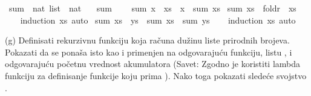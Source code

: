 \begin{isabellebody}
\begin{exercise}[subtitle=Primer jednostavne teorije]
\begin{isamarkuptext}
\end{isamarkuptext}\isamarkuptrue%
\isamarkupfalse%
\ sum\ {\isacharcolon}{\kern0pt}{\isacharcolon}{\kern0pt}\ {\isachardoublequoteopen}nat\ list\ {\isasymRightarrow}\ nat{\isachardoublequoteclose}\ \isanewline
\ \ {\isachardoublequoteopen}sum\ {\isacharbrackleft}{\kern0pt}{\isacharbrackright}{\kern0pt}\ {\isacharequal}{\kern0pt}\ {}{\isachardoublequoteclose}\isanewline
{\isacharbar}{\kern0pt}\ {\isachardoublequoteopen}sum\ {\isacharparenleft}{\kern0pt}x\ {\isacharhash}{\kern0pt}\ xs{\isacharparenright}{\kern0pt}\ {\isacharequal}{\kern0pt}\ x\ {\isacharplus}{\kern0pt}\ sum\ xs{\isachardoublequoteclose}\isanewline
\isanewline
{}\isamarkupfalse%
\ {\isachardoublequoteopen}sum\ xs\ {\isacharequal}{\kern0pt}\ foldr\ {\isacharparenleft}{\kern0pt}{\isacharplus}{\kern0pt}{\isacharparenright}{\kern0pt}\ xs\ {}{\isachardoublequoteclose}\isanewline
%
\isadelimproof
\ \ %
\endisadelimproof
%
\isatagproof
{}\isamarkupfalse%
\ {\isacharparenleft}{\kern0pt}induction\ xs{\isacharparenright}{\kern0pt}\ auto%
\endisatagproof
{\isafoldproof}%
%
\isadelimproof
\isanewline
%
\endisadelimproof
\isanewline
{}\isamarkupfalse%
\ {\isachardoublequoteopen}sum\ {\isacharparenleft}{\kern0pt}xs\ {\isacharat}{\kern0pt}\ ys{\isacharparenright}{\kern0pt}\ {\isacharequal}{\kern0pt}\ sum\ xs\ {\isacharplus}{\kern0pt}\ sum\ ys{\isachardoublequoteclose}\isanewline
%
\isadelimproof
\ \ %
\endisadelimproof
%
\isatagproof
{}\isamarkupfalse%
\ {\isacharparenleft}{\kern0pt}induction\ xs{\isacharparenright}{\kern0pt}\ auto%
\endisatagproof
{\isafoldproof}%
%
\isadelimproof
%
\endisadelimproof
%
\begin{isamarkuptext}%
(g) Definisati rekurzivnu funkciju  koja računa dužinu 
          liste prirodnih brojeva. Pokazati da se  ponaša isto kao 
          i  primenjen na odgovarajuću funkciju, listu , i
          odgovarajuću početnu vrednost akumulatora (Savet: Zgodno je koristiti 
          lambda funkciju  za definisanje funkcije koju prima
          ). Nako toga pokazati sledeće svojstvo 
          .%

\end{isamarkuptext}
\end{exercise}
\end{isabellebody}
